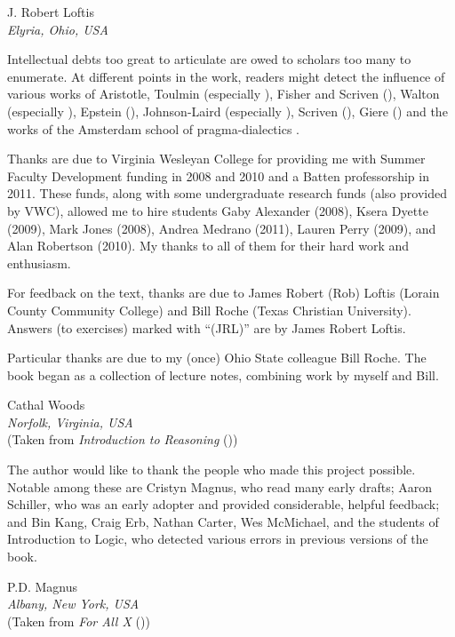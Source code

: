  \begin{adjustwidth}{2em}{0em} 
 J. Robert Loftis \\
\noindent \emph{Elyria, Ohio, USA} 
\end{adjustwidth}

\pagebreak
	
\thispagestyle{empty}

                                    
\noindent Intellectual debts too great to articulate are owed to scholars too many to enumerate. At different points in the work, readers might detect the influence of various works of Aristotle, Toulmin (especially \citeyear{Toulmin1958}), Fisher and Scriven (\citeyear{Fisher1997}), Walton (especially \citeyear{Walton1996}), Epstein (\citeyear{Epstein2002}), Johnson-Laird (especially \citeyear{johnson2006we}), Scriven (\citeyear{Scriven1962}), Giere (\citeyear{giere1997understanding}) and the works of the Amsterdam school of pragma-dialectics \citep{van2002argumentation}.

Thanks are due to Virginia Wesleyan College for providing me with Summer Faculty Development funding in 2008 and 2010 and a Batten professorship in 2011. These funds, along with some undergraduate research funds (also provided by VWC), allowed me to hire students Gaby Alexander (2008), Ksera Dyette (2009), Mark Jones (2008), Andrea Medrano (2011), Lauren Perry (2009), and Alan Robertson (2010). My thanks to all of them for their hard work and enthusiasm.

For feedback on the text, thanks are due to James Robert (Rob) Loftis (Lorain County Community College) and Bill Roche (Texas Christian University). Answers (to exercises) marked with “(JRL)” are by James Robert Loftis.

Particular thanks are due to my (once) Ohio State colleague Bill Roche. The book began as a collection of lecture notes, combining work by myself and Bill. 

\begin{adjustwidth}{2em}{0em}
Cathal Woods\\
\noindent\emph{Norfolk, Virginia, USA}\\
\noindent(Taken from \emph{Introduction to Reasoning} (\citeyear{Woods2014}))
\end{adjustwidth}


\vspace{3cm}

\noindent The author would like to thank the people who made this project possible. Notable among these are Cristyn Magnus, who read many early drafts; Aaron Schiller, who was an early adopter and provided considerable, helpful feedback; {and} Bin Kang, Craig Erb, Nathan Carter, Wes McMichael, and the students of Introduction to Logic, who detected various errors in previous versions of the book.


\begin{adjustwidth}{2em}{0em}
P.D. Magnus \\
\noindent\emph{Albany, New York, USA}\\
\noindent(Taken from \emph{For All X} (\citeyear{Magnus2008})) 
\end{adjustwidth}

